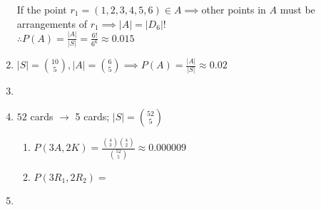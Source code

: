 \documentclass{article}
\begin{document}
\begin{enumerate}
  If the point $r_1 = (1,2,3,4,5,6) \in A \implies$other points in $A$ must be arrangements of $r_1 \implies |A| = |D_6|!$\\
  $\therefore P(A) = \frac{|A|}{|S|} = \frac{6!}{6^6} \approx 0.015$
  \item $|S| = \binom{10}{5}, |A| = \binom{6}{5} \implies P(A) = \frac{|A|}{|S|} \approx 0.02$
  \item 
  \item $52$ cards $\to$ 5 cards; $|S| = \binom{52}{5}$ \begin{enumerate}
    \item $P(3A, 2K) = \frac{\binom{4}{3}\binom{4}{2}}{\binom{52}{5}} \approx 0.000009$
    \item $P(3R_1, 2R_2) = $
  \end{enumerate}
  \item 
\end{enumerate}
\end{document}
